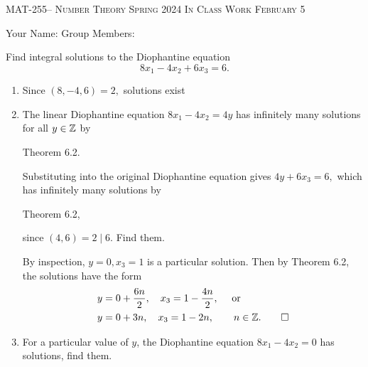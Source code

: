 \documentclass[handout]{ximera}
\date{February 5, 2024}
\begin{document}
\handoutAbstract
\maketitle
  \begin{center}%
    {\large \scshape MAT-255-- Number Theory \hfill Spring 2024 \hfill In Class Work February 5}%
    
    {\large
        Your Name: \hrulefill \quad Group Members:\hrulefill \quad \hrulefill
	\par}%
  \end{center}%
  
\begin{br}
    Find integral solutions to the Diophantine equation \[8x_1-4x_2+6x_3=6.\]
    
    \begin{enumerate}
        \item Since $(8,-4,6)=2,$ solutions exist
        \item The linear Diophantine equation $8x_1-4x_2=4y$ has infinitely many solutions for all $y\in\mathbb Z$ by 
        \begin{freeResponse}
            Theorem 6.2.
        \end{freeResponse}
        \pdfOnly{\ifhandout{
            \rule{2 cm}{0.4pt}}
                \else
                \fi}
        Substituting into the original Diophantine equation gives $4y+6x_3=6,$ which has infinitely many solutions by 
        \begin{freeResponse}
            Theorem 6.2,
        \end{freeResponse}
        \pdfOnly{\ifhandout{
            \rule{2 cm}{0.4pt}}
                \else
                \fi}
        since $(4,6)=2\mid 6$. Find them.
         
        \begin{solution}
            By inspection, $y=0,x_3=1$ is a particular solution. Then by Theorem 6.2, the solutions have the form 
            \begin{align*}
                y&=0+\frac{6n}{2},\quad x_3=1-\frac{4n}{2}, \quad \textnormal{ or }\\
                y&=0+3n,\quad x_3=1-2n, \qquad n\in\mathbb Z. \qedhere
            \end{align*}
        \end{solution}
        \item  For a particular value of $y$, the Diophantine equation $8x_1-4x_2=0$ has solutions, find them. 
        

\end{enumerate}
\end{br}
\end{document}
